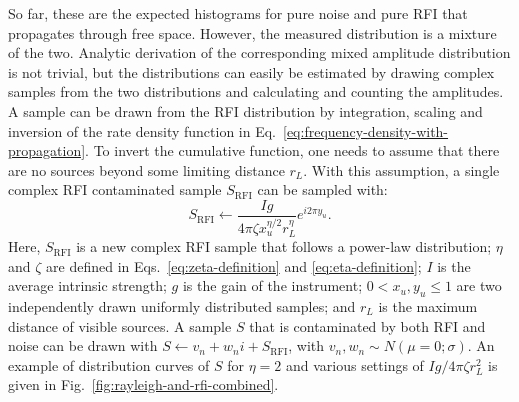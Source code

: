 \documentclass[useAMS,usenatbib]{mn2e}
\begin{document}
So far, these are the expected histograms for pure noise and pure RFI that propagates through free space. However, the measured distribution is a mixture of the two. Analytic derivation of the corresponding mixed amplitude distribution is not trivial, but the distributions can easily be estimated by drawing complex samples from the two distributions and calculating and counting the amplitudes. A sample can be drawn from the RFI distribution by integration, scaling and inversion of the rate density function in Eq.~\eqref{eq:frequency-density-with-propagation}. To invert the cumulative function, one needs to assume that there are no sources beyond some limiting distance $r_L$. With this assumption, a single complex RFI contaminated sample $S_{\textrm{RFI}}$ can be sampled with:
\begin{equation} \label{eq:drawing-rfi-with-propagation}
S_{\textrm{RFI}} \leftarrow \frac{I g}{4\pi \zeta x_u^{\eta/2} r_L^\eta} e^{i 2 \pi y_u}.
\end{equation}
Here, $S_{\textrm{RFI}}$ is a new complex RFI sample that follows a power-law distribution; $\eta$ and $\zeta$ are defined in Eqs.~\eqref{eq:zeta-definition} and \eqref{eq:eta-definition}; $I$ is the average intrinsic strength; $g$ is the gain of the instrument; $0 < x_u,y_u \le 1$ are two independently drawn uniformly distributed samples; and $r_L$ is the maximum distance of visible sources. A sample $S$ that is contaminated by both RFI and noise can be drawn with
$S \leftarrow v_n + w_n i + S_{\textrm{RFI}}$, with $v_n, w_n \sim N(\mu=0; \sigma)$. An example of distribution curves of $S$ for $\eta=2$ and various settings of $Ig/4\pi \zeta r_L^2$ is given in Fig.~\ref{fig:rayleigh-and-rfi-combined}.
\end{document}
